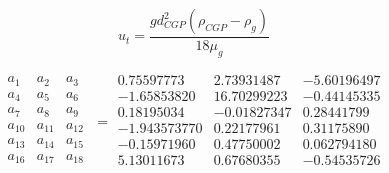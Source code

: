 \begin{equation}
    u_t = \frac{g d_{CGP}^2 (\rho_{CGP} - \rho_g)}{18 \mu_g}
\end{equation}

\begin{equation}
    \begin{matrix}
        a_1    & a_2    & a_3 \\
        a_4    & a_5    & a_6 \\
        a_7    & a_8    & a_9 \\
        a_{10} & a_{11} & a_{12} \\
        a_{13} & a_{14} & a_{15} \\
        a_{16} & a_{17} & a_{18} \\
    \end{matrix}
    \; =
    \begin{array}{rrr}
        0.75597773   & 2.73931487  & -5.60196497 \\
        -1.65853820  & 16.70299223 & -0.44145335 \\
        0.18195034   & -0.01827347 & 0.28441799  \\
        -1.943573770 & 0.22177961  & 0.31175890  \\
        -0.15971960  & 0.47750002  & 0.062794180 \\
        5.13011673   & 0.67680355  & -0.54535726 \\
    \end{array}
\end{equation}
